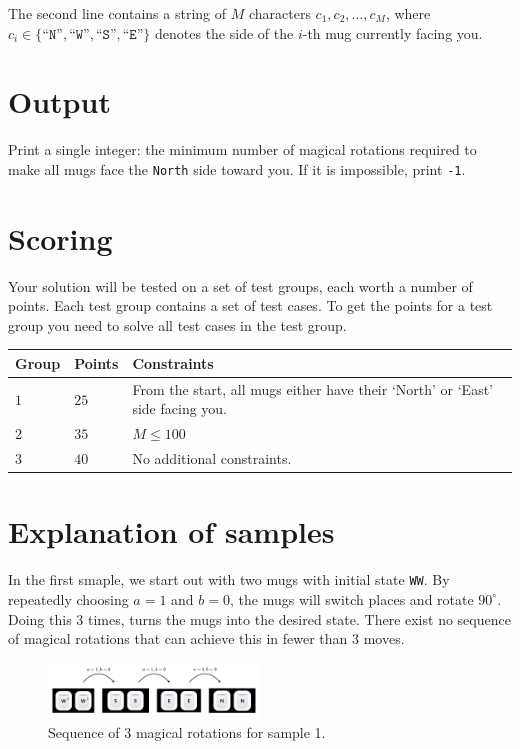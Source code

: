 The second line contains a string of $M$ characters $c_1, c_2, \dots, c_M$, where $c_i \in \{\texttt{``N''},\texttt{``W''},\texttt{``S''},\texttt{``E''}\}$ denotes the side of the $i$-th mug currently facing you.

\section*{Output}
Print a single integer: the minimum number of magical rotations required to make all mugs face the \texttt{North} side toward you. If it is impossible, print \texttt{-1}.

\section*{Scoring}
Your solution will be tested on a set of test groups, each worth a number of points. Each test group contains
a set of test cases. To get the points for a test group you need to solve all test cases in the test group.

\noindent
\begin{tabular}{| l | l | p{12cm} |}
  \hline
  \textbf{Group} & \textbf{Points} & \textbf{Constraints} \\ \hline
  $1$    & $25$       & From the start, all mugs either have their `North' or `East' side facing you. \\ \hline
  $2$    & $35$       & $M \leq 100$ \\ \hline
  $3$    & $40$       & No additional constraints. \\ \hline
\end{tabular}


\section*{Explanation of samples}
\noindent
In the first smaple, we start out with two mugs with initial state \texttt{WW}. 
By repeatedly choosing $a = 1$ and $b = 0$, the mugs will switch places and rotate $90^\circ$. Doing this 3 times, turns the mugs into the desired state. 
There exist no sequence of magical rotations that can achieve this in fewer than 3 moves.
\begin{figure}[h!]
  \centering
  \includegraphics[width=0.5\textwidth]{sample1.png}
  \caption{Sequence of 3 magical rotations for sample 1.}
\end{figure}



